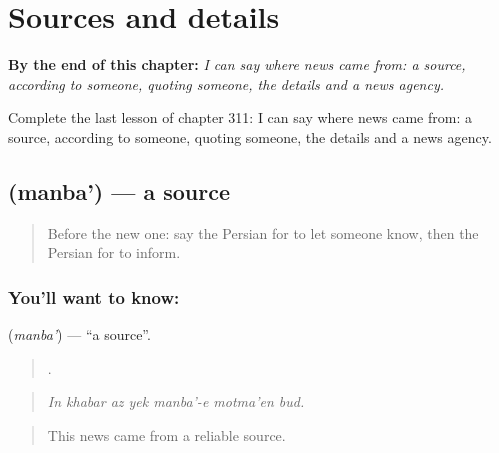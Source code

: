 
\chapter{Sources and details}
\label{ch:fa-sources-and-details}

\begin{chapteropening}
\textbf{By the end of this chapter:} \emph{I can say where news came from: a source, according to someone, quoting someone, the details and a news agency.}

Complete the last lesson of chapter 311: I can say where news came from: a source, according to someone, quoting someone, the details and a news agency.
\end{chapteropening}

\section[\texorpdfstring{\fa{منبع} (manba')}{منبع (manba')}]{ (manba') — a source}

\label{lesson:FA-C311-manba}



\begin{quote}
Before the new one: say the Persian for to let someone know, then the Persian for to inform.
\end{quote}

\subsection*{You'll want to know: }
\textbf{} (\emph{manba'}) — \textquotedblleft{}a source\textquotedblright{}.

\begin{quote}
      .
\end{quote}

\begin{quote}
\emph{In khabar az yek manba'-e motma'en bud.}
\end{quote}

\begin{quote}
This news came from a reliable source.
\end{quote}

